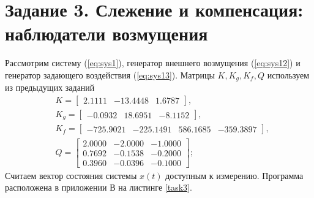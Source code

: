 \documentclass[a4paper, 12pt]{article}
\begin{document}
    \section{Задание 3. Слежение и компенсация: наблюдатели возмущения}
    Рассмотрим систему (\ref{eq:sys1}), генератор внешнего возмущения
    (\ref{eq:sys12}) и генератор задающего воздействия (\ref{eq:sys13}).
    Матрицы $K,K_g,K_f,Q$ используем из предыдущих заданий
    \begin{align*}
        &K=\begin{bmatrix}
            2.1111  &-13.4448    &1.6787
        \end{bmatrix},\\
        &K_g=
        \begin{bmatrix}
            -0.0932   &18.6951   &-8.1152
        \end{bmatrix},\\
        &K_f=\begin{bmatrix}
            -725.9021 &-225.1491  &586.1685 &-359.3897
        \end{bmatrix},\\
        &Q=\begin{bmatrix}
            2.0000   &-2.0000   &-1.0000\\
    0.7692   &-0.1538   &-0.2000\\
    0.3960   &-0.0396   &-0.1000
        \end{bmatrix};
    \end{align*}
    Считаем вектор состояния системы $x(t)$ доступным к измерению.
    Программа расположена в приложении В на листинге \ref{task3}.
\end{document}
